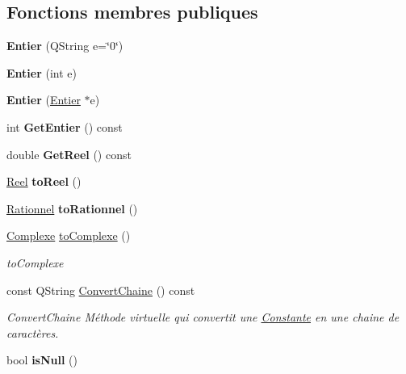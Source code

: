 \subsection*{Fonctions membres publiques}
\begin{DoxyCompactItemize}
\item 
\hypertarget{class_calcul_1_1_entier_aa95e3fe95acf3f49833246dea376e020}{{\bfseries Entier} (Q\-String e=\char`\"{}0\char`\"{})}\label{class_calcul_1_1_entier_aa95e3fe95acf3f49833246dea376e020}

\item 
\hypertarget{class_calcul_1_1_entier_afbaaaf29663668771b65630b394f5224}{{\bfseries Entier} (int e)}\label{class_calcul_1_1_entier_afbaaaf29663668771b65630b394f5224}

\item 
\hypertarget{class_calcul_1_1_entier_a5c76d9b068af9beaf3bc792d45020303}{{\bfseries Entier} (\hyperlink{class_calcul_1_1_entier}{Entier} $\ast$e)}\label{class_calcul_1_1_entier_a5c76d9b068af9beaf3bc792d45020303}

\item 
\hypertarget{class_calcul_1_1_entier_a2c99d3c3f8ec5346b94e3466b940cf99}{int {\bfseries Get\-Entier} () const }\label{class_calcul_1_1_entier_a2c99d3c3f8ec5346b94e3466b940cf99}

\item 
\hypertarget{class_calcul_1_1_entier_a7b917c5e0a8ae9278cf0ee0092ba608c}{double {\bfseries Get\-Reel} () const }\label{class_calcul_1_1_entier_a7b917c5e0a8ae9278cf0ee0092ba608c}

\item 
\hypertarget{class_calcul_1_1_entier_a3dd4de5f5c21961124d2a57613b7009d}{\hyperlink{class_calcul_1_1_reel}{Reel} {\bfseries to\-Reel} ()}\label{class_calcul_1_1_entier_a3dd4de5f5c21961124d2a57613b7009d}

\item 
\hypertarget{class_calcul_1_1_entier_a5797bcf92c69da8d07ce6f1c509a3dbe}{\hyperlink{class_calcul_1_1_rationnel}{Rationnel} {\bfseries to\-Rationnel} ()}\label{class_calcul_1_1_entier_a5797bcf92c69da8d07ce6f1c509a3dbe}

\item 
\hyperlink{class_calcul_1_1_complexe}{Complexe} \hyperlink{class_calcul_1_1_entier_a7d0bcf436ce6517b8738f79eadda1f8a}{to\-Complexe} ()
\begin{DoxyCompactList}\small\item\em to\-Complexe \end{DoxyCompactList}\item 
const Q\-String \hyperlink{class_calcul_1_1_entier_ae8e0b25ab85569d478cce96f02d31959}{Convert\-Chaine} () const 
\begin{DoxyCompactList}\small\item\em Convert\-Chaine Méthode virtuelle qui convertit une \hyperlink{class_calcul_1_1_constante}{Constante} en une chaine de caractères. \end{DoxyCompactList}\item 
\hypertarget{class_calcul_1_1_entier_a1e951a312e427fb2cf7e32c666fe697d}{bool {\bfseries is\-Null} ()}\label{class_calcul_1_1_entier_a1e951a312e427fb2cf7e32c666fe697d}


\end{DoxyCompactItemize}
